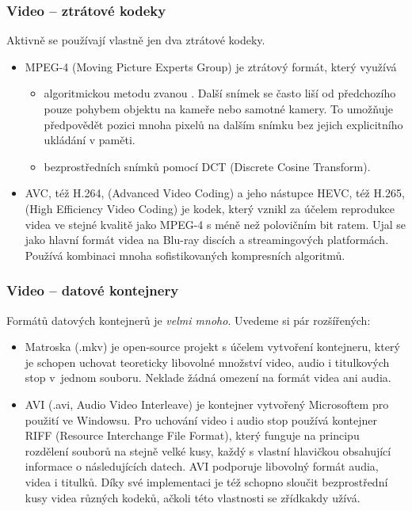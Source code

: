 \documentclass[aspectratio=169,11pt,svgnames,handout]{beamer}
\begin{document}
\begin{frame}
 \frametitle{Video -- ztrátové kodeky}
 Aktivně se používají vlastně jen dva ztrátové kodeky.
 \begin{itemize}[label=\textbullet]
  \item \alert{MPEG-4} (Moving Picture Experts Group) je ztrátový formát, který
   využívá
  \begin{itemize}[label=\textemdash]
   \item algoritmickou metodu zvanou . Další snímek se
    často liší od předchozího pouze pohybem objektu na kameře nebo samotné
    kamery. To umožňuje předpovědět pozici mnoha pixelů na dalším snímku bez
    jejich explicitního ukládání v paměti.
   \pause
   \item {} bezprostředních snímků pomocí DCT (Discrete Cosine
    Transform).
  \end{itemize}
 \item \alert{AVC, též H.264}, (Advanced Video Coding) a jeho nástupce
  \alert{HEVC, též H.265}, (High Efficiency Video Coding) je kodek, který vznikl
  za účelem reprodukce videa ve stejné kvalitě jako MPEG-4 s méně než polovičním
  bit ratem. Ujal se jako hlavní formát videa na Blu-ray discích a
  streamingových platformách. Používá kombinaci mnoha sofistikovaných
  kompresních algoritmů.
 \end{itemize}
\end{frame}

\begin{frame}
 \frametitle{Video -- datové kontejnery}
 Formátů datových kontejnerů je \emph{velmi mnoho}. Uvedeme si pár rozšířených:
 \begin{itemize}[label=\textbullet]
  \item \alert{Matroska} (.mkv) je open-source projekt s účelem vytvoření
   kontejneru, který je schopen uchovat teoreticky libovolné množství video,
   audio i titulkových stop v~jednom souboru. Neklade žádná omezení na formát
   videa ani audia.
  \pause
  \item \alert{AVI} (.avi, Audio Video Interleave) je kontejner vytvořený
   Microsoftem pro použití ve Windowsu. Pro uchování video i audio stop používá
   kontejner \alert{RIFF} (Resource Interchange File Format), který funguje na
   principu rozdělení souborů na stejně velké kusy, každý s vlastní hlavičkou
   obsahující informace o následujících datech. AVI podporuje libovolný formát
   audia, videa i titulků. Díky své implementaci je též schopno sloučit
   bezprostřední kusy videa různých kodeků, ačkoli této vlastnosti se zřídkakdy
   užívá.
 \end{itemize}
\end{frame}
\end{document}
